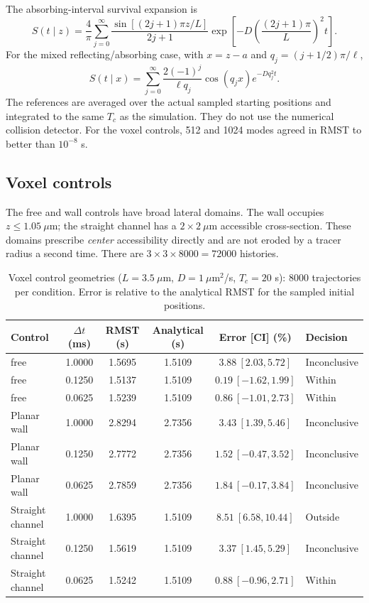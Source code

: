 \documentclass[a4paper,10pt]{article}
\numberwithin{equation}{section}
\begin{document}
The absorbing-interval survival expansion is
\begin{equation}
S(t\mid z)=\frac4\pi\sum_{j=0}^\infty
\frac{\sin[(2j+1)\pi z/L]}{2j+1}
\exp\!\left[-D\left(\frac{(2j+1)\pi}{L}\right)^2t\right].
\end{equation}
For the mixed reflecting/absorbing case, with $x=z-a$ and $q_j=(j+1/2)\pi/\ell$,
\begin{equation}
S(t\mid x)=\sum_{j=0}^\infty
\frac{2(-1)^j}{\ell q_j}\cos(q_jx)e^{-Dq_j^2t}.
\end{equation}
The references are averaged over the actual sampled starting positions and integrated to the same $T_c$ as the simulation. They do not use the numerical collision detector. For the voxel controls, 512 and 1024 modes agreed in RMST to better than $10^{-8}$ s.

\subsection*{Voxel controls}
The free and wall controls have broad lateral domains. The wall occupies $z\le1.05~\mu$m; the straight channel has a $2\times2~\mu$m accessible cross-section. These domains prescribe \emph{center} accessibility directly and are not eroded by a tracer radius a second time. There are $3\times3\times8000=72000$ histories.

\begin{table}[!htbp]
\centering\small
\setlength{\tabcolsep}{4pt}
\caption{Voxel control geometries ($L=3.5~\mu$m, $D=1~\mu$m$^2$/s, $T_c=20$ s): 8000 trajectories per condition. Error is relative to the analytical RMST for the sampled initial positions.}\label{tab:obstacles}
\begin{tabular}{@{}lccccl@{}}
\toprule
Control & $\Delta t$ (ms) & RMST (s) & Analytical (s) & Error [CI] (\%) & Decision \\ \midrule
free & 1.0000 & 1.5695 & 1.5109 & $3.88\ [2.03,5.72]$ & Inconclusive \\
free & 0.1250 & 1.5137 & 1.5109 & $0.19\ [-1.62,1.99]$ & Within \\
free & 0.0625 & 1.5239 & 1.5109 & $0.86\ [-1.01,2.73]$ & Within \\
Planar wall & 1.0000 & 2.8294 & 2.7356 & $3.43\ [1.39,5.46]$ & Inconclusive \\
Planar wall & 0.1250 & 2.7772 & 2.7356 & $1.52\ [-0.47,3.52]$ & Inconclusive \\
Planar wall & 0.0625 & 2.7859 & 2.7356 & $1.84\ [-0.17,3.84]$ & Inconclusive \\
Straight channel & 1.0000 & 1.6395 & 1.5109 & $8.51\ [6.58,10.44]$ & Outside \\
Straight channel & 0.1250 & 1.5619 & 1.5109 & $3.37\ [1.45,5.29]$ & Inconclusive \\
Straight channel & 0.0625 & 1.5242 & 1.5109 & $0.88\ [-0.96,2.71]$ & Within \\
\bottomrule
\end{tabular}
\end{table}
\end{document}
